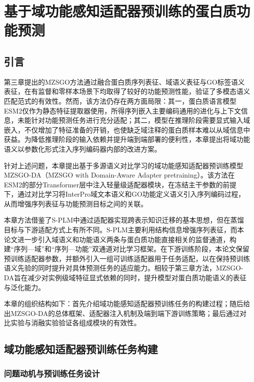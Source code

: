 
\chapter{基于域功能感知适配器预训练的蛋白质功能预测}

\section{引言}

第三章提出的MZSGO方法通过融合蛋白质序列表征、域语义表征与GO标签语义表征，在有监督和零样本场景下均取得了较好的功能预测性能，验证了多模态语义匹配范式的有效性。然而，该方法仍存在两方面局限：其一，蛋白质语言模型ESM2仅作为静态特征提取器使用，所得序列嵌入主要编码通用的进化与上下文信息，未能针对功能预测任务进行充分适配；其二，模型在推理阶段需要显式输入域嵌入，不仅增加了特征准备的开销，也使缺乏域注释的蛋白质样本难以从域信息中获益。为降低推理阶段的输入依赖并提升端到端部署的便利性，本章提出将域功能语义以参数化形式注入序列编码器内部的改进方案。

针对上述问题，本章提出基于多源语义对比学习的域功能感知适配器预训练模型MZSGO-DA（MZSGO with Domain-Aware Adapter pretraining）。该方法在ESM2的部分Transformer层中注入轻量级适配器模块，在冻结主干参数的前提下，通过对比学习将InterPro域文本语义和GO功能定义语义引入序列编码过程，从而增强序列表征与功能预测目标之间的关联。

本章方法借鉴了S-PLM\cite{wang2025splm}中通过适配器实现跨表示知识迁移的基本思想，但在蒸馏目标与下游适配方式上有所不同。S-PLM主要利用结构信息增强序列表征，而本论文进一步引入域语义和功能语义两条与蛋白质功能直接相关的监督通道，构建“序列—域”和“序列—功能”双通道对比学习框架。在下游训练阶段，本论文保留预训练适配器参数，并额外引入一组可训练适配器用于任务适配，以在保持预训练语义先验的同时提升对具体预测任务的适应能力。相较于第三章方法，MZSGO-DA旨在减少对实例级域特征显式依赖的同时，提升模型对蛋白质功能语义的表征与泛化能力。

本章的组织结构如下：首先介绍域功能感知适配器预训练任务的构建过程；随后给出MZSGO-DA的总体框架、适配器注入机制及端到端下游训练策略；最后通过对比实验与消融实验验证各组成模块的有效性。

\section{域功能感知适配器预训练任务构建}

\subsection{问题动机与预训练任务设计}

